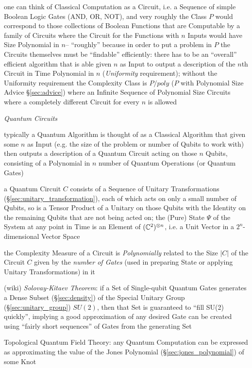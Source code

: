 one can think of Classical Computation as a Circuit, i.e. a Sequence of simple
Boolean Logic Gates (AND, OR, NOT), and very roughly the Class $P$ would
correspond to those collections of Boolean Functions that are Computable by a
family of Circuits where the Circuit for the Functions with $n$ Inputs would
have Size Polynomial in $n$-- ``roughly'' because in order to put a problem in
$P$ the Circuits themselves must be ``findable'' efficiently: there has to be an
``overall'' efficient algorithm that is able given $n$ as Input to output a
description of the $n$th Circuit in Time Polynomial in $n$ (\emph{Uniformity}
requirement); without the Uniformity requirement the Complexity Class is
$P/poly$ ($P$ with Polynomial Size Advice \S\ref{sec:advice}) where an Infinite
Sequence of Polynomial Size Circuits where a completely different Circuit for
every $n$ is allowed

\emph{Quantum Circuits}

typically a Quantum Algorithm is thought of as a Classical Algorithm that given
some $n$ as Input (e.g. the size of the problem or number of Qubits to work
with) then outputs a description of a Quantum Circuit acting on those $n$
Qubits, consisting of a Polynomial in $n$ number of Quantum Operations (or
Quantum Gates)

a Quantum Circuit $C$ consists of a Sequence of Unitary Transformations
(\S\ref{sec:unitary_transformation}), each of which acts on only a small number
of Qubits, so is a Tensor Product of a Unitary on those Qubits with the Identity
on the remaining Qubits that are not being acted on; the (Pure) State $\Psi$ of
the System at any point in Time is an Element of $(\mathbb{C}^2)^{\otimes n}$, i.e.
a Unit Vector in a $2^n$-dimensional Vector Space

the Complexity Measure of a Circuit is \emph{Polynomially} related to the Size
$|C|$ of the Circuit $C$ given by the \emph{number of Gates} (used in preparing
State or applying Unitary Transformations) in it

(wiki) \emph{Solovay-Kitaev Theorem}: if a Set of Single-qubit Quantum Gates
generates a Dense Subset (\S\ref{sec:density}) of the Special Unitary Group
(\S\ref{sec:unitary_group}) $SU(2)$, then that Set is guaranteed to ``fill SU(2)
quickly'', implying a good approximation of any desired Gate can be created
using ``fairly short sequences'' of Gates from the generating Set

Topological Quantum Field Theory: any Quantum Computation can be expressed as
approximating the value of the Jones Polynomial (\S\ref{sec:jones_polynomial})
of some Knot

